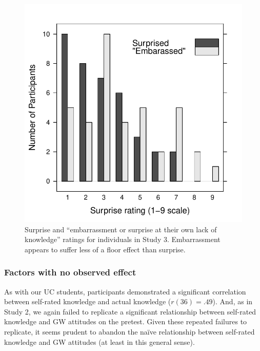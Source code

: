 \begin{figure}
    \centering
    \includegraphics{CCO-mech-surprise-by-question.pdf}
    \caption{Surprise and “embarrassment or surprise at their own lack of
        knowledge” ratings for individuals in Study 3.  Embarrassment appears to
        suffer less of a floor effect than surprise.}
    \label{fig:CCO-mech-surprise}
\end{figure}


\subsubsection{Factors with no observed effect}

As with our UC students, participants demonstrated a significant correlation
between self-rated knowledge and actual knowledge ($r(36)=.49$).  And, as in
Study 2, we again failed to replicate a significant relationship between
self-rated knowledge and GW attitudes on the pretest. Given these repeated
failures to replicate, it seems prudent to abandon the naïve relationship
between self-rated knowledge and GW attitudes (at least in this general sense).


